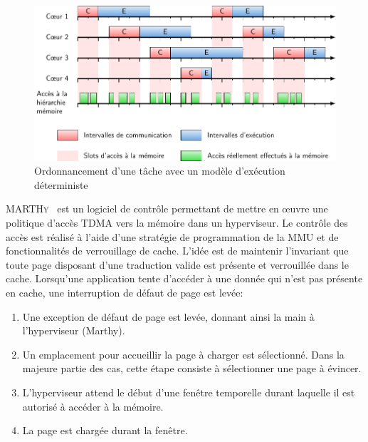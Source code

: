 
\begin{figure}
	\centering
	\includegraphics[width=\linewidth]{graphics/figures/prem.pdf}
	\caption{\label{fig:prem}Ordonnancement d'une tâche avec un modèle d'exécution déterministe}
\end{figure}

\textsc{MARTHy}~\cite{jean2015hypervisor} est un logiciel de contrôle permettant de mettre en œuvre une politique d'accès TDMA vers la mémoire dans un hyperviseur.
Le contrôle des accès est réalisé à l'aide d'une stratégie de programmation de la MMU et de fonctionnalités de verrouillage de cache.
L'idée est de maintenir l'invariant que toute page disposant d'une traduction valide est présente et verrouillée dans le cache.
Lorsqu'une application tente d'accéder à une donnée qui n'est pas présente en cache, une interruption de défaut de page est levée:
\begin{enumerate}
	\item Une exception de défaut de page est levée, donnant ainsi la main à l'hyperviseur (Marthy).
	\item Un emplacement pour accueillir la page à charger est sélectionné. 
	Dans la majeure partie des cas, cette étape consiste à sélectionner une page à évincer.
	\item L'hyperviseur attend le début d'une fenêtre temporelle durant laquelle il est autorisé à accéder à la mémoire.
	\item La page est chargée durant la fenêtre.
\end{enumerate}


